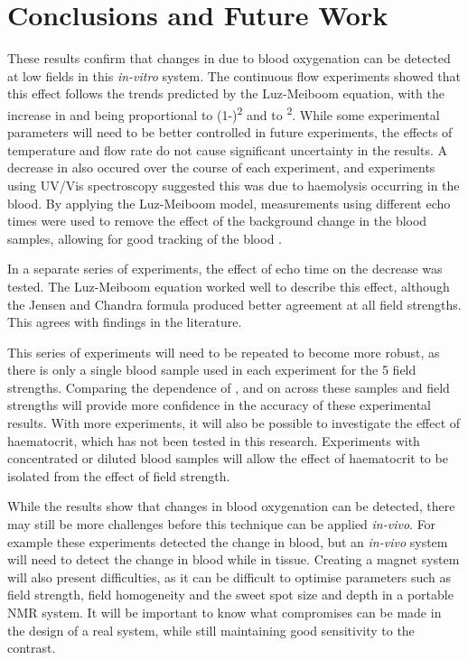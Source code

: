 \chapter{Conclusions and Future Work}\label{ch:conc}

These results confirm that changes in \Ttwo due to blood oxygenation can be detected at low fields in this \textit{in-vitro} system.
The continuous flow experiments showed that this \Ttwo effect follows the trends predicted by the Luz-Meiboom equation, with the increase in \Rtwo and \Kzero being proportional to (1-\SOtwo)\textsuperscript{2} and to \Bzero\textsuperscript{2}.
While some experimental parameters will need to be better controlled in future experiments, the effects of temperature and flow rate do not cause significant uncertainty in the results.
A decrease in \Ttwo also occured over the course of each experiment, and experiments using UV/Vis spectroscopy suggested this was due to haemolysis occurring in the blood.
By applying the Luz-Meiboom model, measurements using different echo times were used to remove the effect of the background \Ttwo change in the blood samples, allowing for good tracking of the blood \SOtwo.

In a separate series of experiments, the effect of echo time on the \Ttwo decrease was tested.
The Luz-Meiboom equation worked well to describe this effect, although the Jensen and Chandra formula produced better agreement at all field strengths.
This agrees with findings in the literature.

This series of experiments will need to be repeated to become more robust, as there is only a single blood sample used in each experiment for the 5 field strengths.
Comparing the dependence of \Ttwo, \Rtwo and \Kzero on \SOtwo across these samples and field strengths will provide more confidence in the accuracy of these experimental results.
With more experiments, it will also be possible to investigate the effect of haematocrit, which has not been tested in this research.
Experiments with concentrated or diluted blood samples will allow the effect of haematocrit to be isolated from the effect of field strength.

While the results show that changes in blood oxygenation can be detected, there may still be more challenges before this technique can be applied \textit{in-vivo}.
For example these experiments detected the \Ttwo change in blood, but an \textit{in-vivo} system will need to detect the \Ttwo change in blood while in tissue.
Creating a magnet system will also present difficulties, as it can be difficult to optimise parameters such as field strength, field homogeneity and the sweet spot size and depth in a portable NMR system.
It will be important to know what compromises can be made in the design of a real system, while still maintaining good sensitivity to the \Ttwo contrast.

